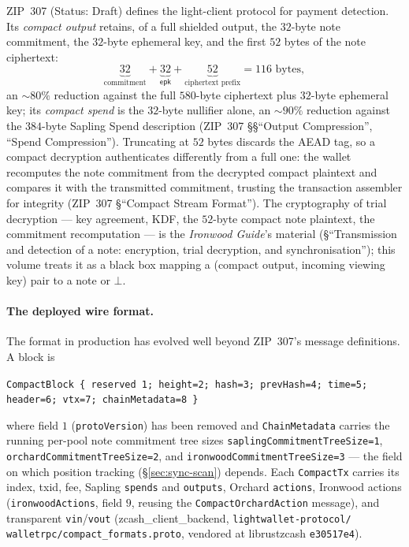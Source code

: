 \documentclass[11pt,a4paper]{article}
\theoremstyle{definition}
\begin{document}
ZIP~307 (Status: Draft) defines the light-client protocol for payment
detection. Its \emph{compact output} retains, of a full shielded output, the
$32$-byte note commitment, the $32$-byte ephemeral key, and the first $52$
bytes of the note ciphertext:
\[
\underbrace{32}_{\text{commitment}} + \underbrace{32}_{\mathsf{epk}} +
\underbrace{52}_{\text{ciphertext prefix}} = 116 \text{ bytes},
\]
an ${\sim}80\%$ reduction against the full $580$-byte ciphertext plus
$32$-byte ephemeral key; its \emph{compact spend} is the $32$-byte nullifier
alone, an ${\sim}90\%$ reduction against the $384$-byte Sapling Spend
description (ZIP~307 \S\S``Output Compression'', ``Spend Compression'').
Truncating at $52$ bytes discards the AEAD tag, so a compact decryption
authenticates differently from a full one: the wallet recomputes the note
commitment from the decrypted compact plaintext and compares it with the
transmitted commitment, trusting the transaction assembler for integrity
(ZIP~307 \S``Compact Stream Format''). The cryptography of trial decryption
--- key agreement, KDF, the $52$-byte compact note plaintext, the commitment
recomputation --- is the \emph{Ironwood Guide}'s material (\S``Transmission
and detection of a note: encryption, trial decryption, and
synchronisation''); this volume treats it as a black box mapping a (compact
output, incoming viewing key) pair to a note or $\bot$.

\paragraph{The deployed wire format.} The format in production has evolved
well beyond ZIP~307's message definitions. A block is
\begin{center}
\texttt{CompactBlock \{ reserved 1; height=2; hash=3; prevHash=4; time=5;}\\
\texttt{header=6; vtx=7; chainMetadata=8 \}}
\end{center}
where field $1$ (\texttt{protoVersion}) has been removed and
\texttt{ChainMetadata} carries the running per-pool note commitment tree
sizes \texttt{saplingCommitmentTreeSize=1},
\texttt{orchardCommitmentTreeSize=2}, and
\texttt{ironwoodCommitmentTreeSize=3} --- the field on which position
tracking (\S\ref{sec:sync-scan}) depends. Each \texttt{CompactTx} carries
its index, txid, fee, Sapling \texttt{spends} and \texttt{outputs}, Orchard
\texttt{actions}, Ironwood actions (\texttt{ironwoodActions}, field $9$,
reusing the \texttt{CompactOrchardAction} message), and transparent
\texttt{vin}/\texttt{vout}
(\textsf{zcash\_client\_backend}, \texttt{lightwallet-protocol/}%
\allowbreak\texttt{walletrpc/compact\_formats.proto}, vendored at
\textsf{librustzcash} \texttt{e30517e4}).
\end{document}
